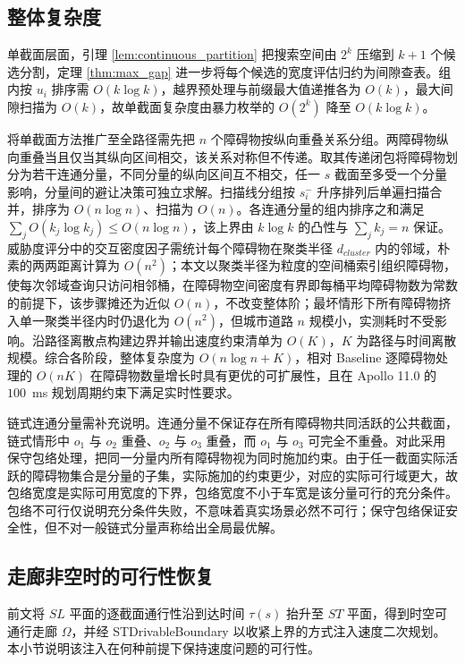 \documentclass[a4paper,11pt]{ctexart}
\theoremstyle{definition}
\begin{document}
\subsection{整体复杂度}
\label{sec:thy_complexity}

单截面层面，引理 \ref{lem:continuous_partition} 把搜索空间由 $2^k$ 压缩到 $k+1$ 个候选分割，定理 \ref{thm:max_gap} 进一步将每个候选的宽度评估归约为间隙查表。组内按 $u_i$ 排序需 $O(k \log k)$，越界预处理与前缀最大值递推各为 $O(k)$，最大间隙扫描为 $O(k)$，故单截面复杂度由暴力枚举的 $O(2^k)$ 降至 $O(k \log k)$。

将单截面方法推广至全路径需先把 $n$ 个障碍物按纵向重叠关系分组。两障碍物纵向重叠当且仅当其纵向区间相交，该关系对称但不传递。取其传递闭包将障碍物划分为若干连通分量，不同分量的纵向区间互不相交，任一 $s$ 截面至多受一个分量影响，分量间的避让决策可独立求解。扫描线分组按 $s_i^{-}$ 升序排列后单遍扫描合并，排序为 $O(n \log n)$、扫描为 $O(n)$。各连通分量的组内排序之和满足 $\sum_j O(k_j \log k_j) \leq O(n \log n)$，该上界由 $k \log k$ 的凸性与 $\sum_j k_j = n$ 保证。威胁度评分中的交互密度因子需统计每个障碍物在聚类半径 $d_{cluster}$ 内的邻域，朴素的两两距离计算为 $O(n^2)$；本文以聚类半径为粒度的空间桶索引组织障碍物，使每次邻域查询只访问相邻桶，在障碍物空间密度有界即每桶平均障碍物数为常数的前提下，该步骤摊还为近似 $O(n)$，不改变整体阶；最坏情形下所有障碍物挤入单一聚类半径内时仍退化为 $O(n^2)$，但城市道路 $n$ 规模小，实测耗时不受影响。沿路径离散点构建边界并输出速度约束清单为 $O(K)$，$K$ 为路径与时间离散规模。综合各阶段，整体复杂度为 $O(n \log n + K)$，相对 Baseline 逐障碍物处理的 $O(nK)$ 在障碍物数量增长时具有更优的可扩展性，且在 Apollo 11.0 的 $100$~ms 规划周期约束下满足实时性要求。

链式连通分量需补充说明。连通分量不保证存在所有障碍物共同活跃的公共截面，链式情形中 $o_1$ 与 $o_2$ 重叠、$o_2$ 与 $o_3$ 重叠，而 $o_1$ 与 $o_3$ 可完全不重叠。对此采用保守包络处理，把同一分量内所有障碍物视为同时施加约束。由于任一截面实际活跃的障碍物集合是分量的子集，实际施加的约束更少，对应的实际可行域更大，故包络宽度是实际可用宽度的下界，包络宽度不小于车宽是该分量可行的充分条件。包络不可行仅说明充分条件失败，不意味着真实场景必然不可行；保守包络保证安全性，但不对一般链式分量声称给出全局最优解。

\subsection{走廊非空时的可行性恢复}
\label{sec:thy_feasibility}

前文将 $SL$ 平面的逐截面通行性沿到达时间 $\tau(s)$ 抬升至 $ST$ 平面，得到时空可通行走廊 $\Omega$，并经 STDrivableBoundary 以收紧上界的方式注入速度二次规划。本小节说明该注入在何种前提下保持速度问题的可行性。
\end{document}
